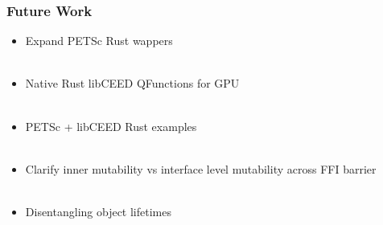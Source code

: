 \documentclass{beamer}
\begin{document}
\begin{frame}
\begin{center}
\frametitle{Future Work}

\begin{itemize}

\item Expand PETSc Rust wappers\\

~\\

\item Native Rust libCEED QFunctions for GPU\\

~\\

\item PETSc + libCEED Rust examples\\

~\\

\item Clarify inner mutability vs interface level mutability across FFI barrier\\

~\\

\item Disentangling object lifetimes\\

\end{itemize}

\end{center}
\end{frame}


\begin{frame}[noframenumbering]
\titlepage %
\end{frame}

\begin{frame}
\end{frame}

\begin{frame}[noframenumbering]
\titlepage %
\end{frame}

\end{document}
